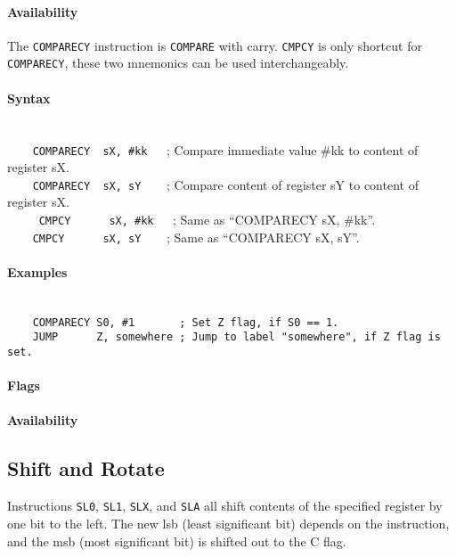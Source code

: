         \paragraph{Availability}
            \pbavailability{\yes}{\yes}{\no}{\no}{\no}

    \clearpage
        The \texttt{COMPARECY} instruction is \texttt{COMPARE} with carry. \texttt{CMPCY} is only shortcut for \texttt{COMPARECY}, these two mnemonics can be used interchangeably.

        \paragraph{Syntax}
            ~\\
            \verb'    COMPARECY  sX, #kk   '; Compare immediate value \#kk to content of register sX.\\
            \verb'    COMPARECY  sX, sY    '; Compare content of register sY to content of register sX.\\\
            \verb'    CMPCY      sX, #kk   '; Same as ``COMPARECY sX, \#kk''.\\
            \verb'    CMPCY      sX, sY    '; Same as ``COMPARECY sX, sY''.

        \paragraph{Examples}
            ~\\
            \verb'    COMPARECY S0, #1       ; Set Z flag, if S0 == 1.'\\
            \verb'    JUMP      Z, somewhere ; Jump to label "somewhere", if Z flag is set.'

        \paragraph{Flags}

        \paragraph{Availability}
            \pbavailability{\yes}{\no}{\no}{\no}{\no}

\clearpage
\subsection{Shift and Rotate}
        Instructions \texttt{SL0}, \texttt{SL1}, \texttt{SLX}, and \texttt{SLA} all shift contents of the specified register by one bit to the left. The new lsb (least significant bit) depends on the instruction, and the msb (most significant bit) is shifted out to the C flag.

